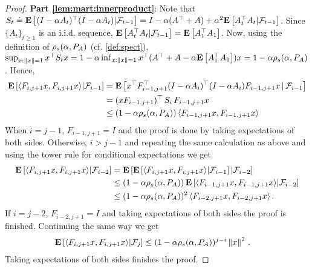 \begin{proof}
\noindent \textbf{Part \ref{lem:mart:innerproduct}}:
Note that
$S_t\doteq \mathbf{E}\left[ (I-\alpha A_t)^\top (I-\alpha A_t) | \mathcal{F}_{t-1} \right]
= I - \alpha (A^\top + A) + \alpha^2 \mathbf{E}\left[ A_t^\top A_t | \mathcal{F}_{t-1} \right]$.
Since $\{A_t\}_{t\ge 1}$ is an i.i.d. sequence, $\mathbf{E}\left[ A_t^\top A_t|\mathcal{F}_{t-1}\right] = \mathbf{E}\left[ A_1^\top A_1 \right]$.
Now, using the definition of $\rho_s(\alpha,P_A)$ (cf. \cref{def:spect}),
$\sup_{x:\left\| x\right\|= 1} x^\top S_t x = 1 - \alpha \inf_{x:\left\| x\right\|=1} x^\top (A^\top + A - \alpha \mathbf{E}\left[A_1^\top A_1\right]) x
= 1-\alpha \rho_s(\alpha,P_A)$.
Hence,
\begin{align*}
\mathbf{E}\left[\langle F_{i,j+1}x,F_{i,j+1}x\rangle|\mathcal{F}_{i-1} \right]
&= \mathbf{E}\left[x^\top F_{i-1,j+1}^\top (I-\alpha A_i)^\top (I-\alpha A_i) F_{i-1,j+1} x\,|\,\mathcal{F}_{i-1}\right]\\
&=(x F_{i-1,j+1})^\top \, S_i \, F_{i-1,j+1} x\\
&\le (1-\alpha \rho_s(\alpha,P_A)) \, \langle F_{i-1,j+1} x, F_{i-1,j+1} x\rangle
\end{align*}
When $i=j-1$, $F_{i-1,j+1}=I$ and the proof is done by taking expectations of both sides.
Otherwise, $i>j-1$ and repeating the same calculation as above
and using the tower rule for conditional expectations we get
\begin{align*}
\mathbf{E}\left[\langle F_{i,j+1}x,F_{i,j+1}x\rangle|\mathcal{F}_{i-2}\right]
&=
\mathbf{E}\left[\mathbf{E}\left[\langle F_{i,j+1}x,F_{i,j+1}x\rangle|\mathcal{F}_{i-1} \right]|\mathcal{F}_{i-2}\right]\\
& \le (1-\alpha \rho_s(\alpha,P_A)) \, \mathbf{E}\left[\langle F_{i-1,j+1} x, F_{i-1,j+1} x\rangle|\mathcal{F}_{i-2}\right] \\
& \le (1-\alpha \rho_s(\alpha,P_A))^2\, \langle F_{i-2,j+1} x, F_{i-2,j+1} x\rangle\,.
\end{align*}
If $i=j-2$, $F_{i-2,j+1}=I$ and taking expectations of both sides the proof is finished.
Continuing the same way we get
\begin{align*}
\mathbf{E}\left[\langle F_{i,j+1}x,F_{i,j+1}x\rangle|\mathcal{F}_{j}\right]
& \le (1-\alpha \rho_s(\alpha,P_A))^{j-i} \left\| x\right\|^2\,.
\end{align*}
Taking expectations of both sides finishes the proof.
\end{proof}

